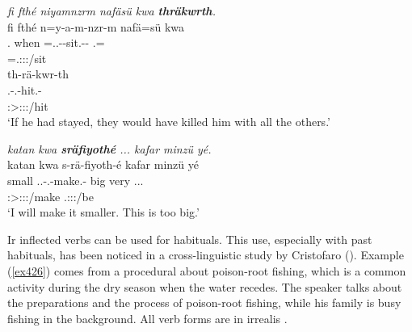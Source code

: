 \begin{exe}
	\ex \emph{fi fthé niyamnzrm nafäsü kwa \textbf{thräkwrth}.}\\
	\glll fi fthé n=y-a-m-nzr-m nafä=sü kwa\\
	\Third.\Abs{} when \Immpst=\Tsg.\Masc.\Alph-\Vc-sit.\Ext-\Ndu-\Dur{} \Third\Assoc.\Pl=\Etc{} \Fut{}\\
	{} {} \footnotesize{\Immpst=\Tsg.\Masc:\Sbj:\Nonpast:\Dur/sit} {} {}\\
	\sn
	\glll th-rä-kwr-th\\
	\Stsg.\Bet-\Irr.\Ndu-hit.\Rs-\Stnsg{}\\
	\footnotesize{\Stpl:\Sbj>\Stpl:\Obj:\Irr:\Pfv/hit}\\
	\trans `If he had stayed, they would have killed him with all the others.'\\
	\label{ex381}
\end{exe}
\begin{exe}
	\ex \emph{katan kwa \textbf{sräfiyothé} ... kafar minzü yé.}\\
	\glll katan kwa s-rä-fiyoth-é kafar minzü yé\\
	small \Fut{} \Tsg.\Masc.\Bet-\Vc.\Ndu-make.\Rs-\Fsg{} big very \Tsg.\Masc.\Cop.\Ndu{}\\
	{} {} \footnotesize{\Fsg:\Sbj>\Tsg:\Obj:\Irr:\Pfv/make} {} {} {} \footnotesize{\Tsg.\Masc:\Sbj:\Nonpast:\Ipfv/be}\\
	\trans `I will make it smaller. This is too big.'
	\label{ex382}
\end{exe}

Ir inflected verbs can be used for habituals. This use, especially with past habituals, has been noticed in a cross-linguistic study by Cristofaro (\citeyear{Cristofaro:2004wi}). Example (\ref{ex426}) comes from a procedural about poison-root fishing, which is a common activity during the dry season when the water recedes. The speaker talks about the preparations and the process of poison-root fishing, while his family is busy fishing in the background. All verb forms are in irrealis .

